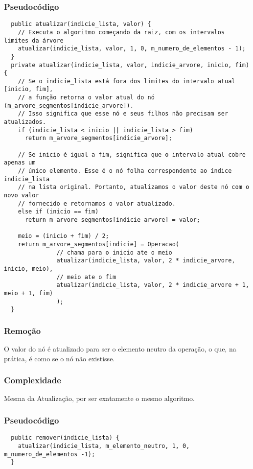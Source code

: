 \documentclass{article}
\begin{document}
\subsubsection{Pseudocódigo}
\begin{verbatim}
  public atualizar(indicie_lista, valor) {
    // Executa o algoritmo começando da raiz, com os intervalos limites da árvore
    atualizar(indicie_lista, valor, 1, 0, m_numero_de_elementos - 1);
  }
  private atualizar(indicie_lista, valor, indicie_arvore, inicio, fim) {
    // Se o indicie_lista está fora dos limites do intervalo atual [inicio, fim],
    // a função retorna o valor atual do nó (m_arvore_segmentos[indicie_arvore]). 
    // Isso significa que esse nó e seus filhos não precisam ser atualizados.
    if (indicie_lista < inicio || indicie_lista > fim) 
      return m_arvore_segmentos[indicie_arvore];

    // Se inicio é igual a fim, significa que o intervalo atual cobre apenas um 
    // único elemento. Esse é o nó folha correspondente ao índice indicie_lista
    // na lista original. Portanto, atualizamos o valor deste nó com o novo valor
    // fornecido e retornamos o valor atualizado.
    else if (inicio == fim) 
      return m_arvore_segmentos[indicie_arvore] = valor;

    meio = (inicio + fim) / 2;
    return m_arvore_segmentos[indicie] = Operacao(
               // chama para o inicio ate o meio
               atualizar(indicie_lista, valor, 2 * indicie_arvore, inicio, meio),
               // meio ate o fim
               atualizar(indicie_lista, valor, 2 * indicie_arvore + 1, meio + 1, fim) 
               );
  }
\end{verbatim}

\subsubsection{Remoção}
O valor do nó é atualizado para ser o elemento neutro da operação, o que, na prática, 
é como se o nó não existisse.
\subsubsection{Complexidade}
Mesma da Atualização, por ser exatamente o mesmo algoritmo.
\subsubsection{Pseudocódigo}
\begin{verbatim}
  public remover(indicie_lista) {
    atualizar(indicie_lista, m_elemento_neutro, 1, 0, m_numero_de_elementos -1);
  }
\end{verbatim}
\end{document}
